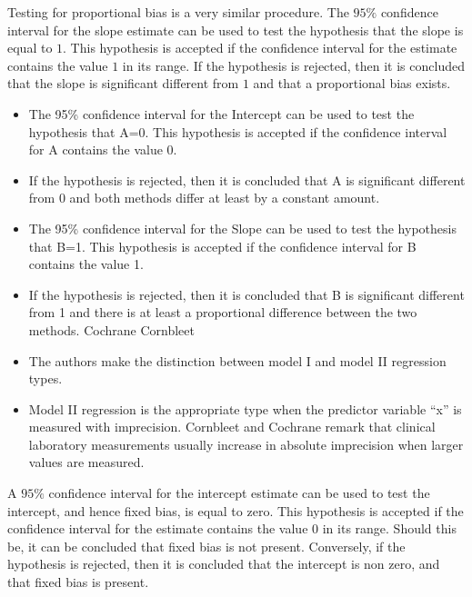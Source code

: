 \documentclass[12pt, a4paper]{report}
\theoremstyle{plain}
\theoremstyle{definition}
\theoremstyle{remark}
\begin{document}
Testing for proportional bias is a very similar procedure. The $95\%$ confidence interval for the slope estimate can be used to
test the hypothesis that the slope is equal to $1$. This hypothesis is accepted if the confidence interval for the estimate
contains the value $1$ in its range. If the hypothesis is rejected, then it is concluded that the slope is significant
different from $1$ and that a proportional bias exists.

\begin{itemize}
	
	\item The 95\% confidence interval for the Intercept can be used to test the hypothesis that A=0. This hypothesis is accepted if the confidence interval for A contains the value 0. 
	\item If the hypothesis is rejected, then it is concluded that A is significant different from 0 and both methods differ at least by a constant amount. 
	
	\item The 95\% confidence interval for the Slope can be used to test the hypothesis that B=1. This hypothesis is accepted if the confidence interval for B contains the value 1. 
	
	\item If the hypothesis is rejected, then it is concluded that B is significant different from 1 and there is at least a proportional difference between the two methods. Cochrane Cornbleet
	\item The authors make the distinction between model I and model II regression types.
	\item Model II regression is the appropriate type when the predictor variable “x” is measured with imprecision.
	Cornbleet and Cochrane remark that clinical laboratory measurements usually increase in absolute imprecision when larger values are measured. %
\end{itemize}

A $95\%$ confidence interval for the intercept estimate can be used to test the intercept, and hence fixed bias, is equal to
zero. This hypothesis is accepted if the confidence interval for the estimate contains the value $0$ in its range. Should this be,
it can be concluded that fixed bias is not present. Conversely, if the hypothesis is rejected, then it is concluded that the
intercept is non zero, and that fixed bias is present.
\end{document}
